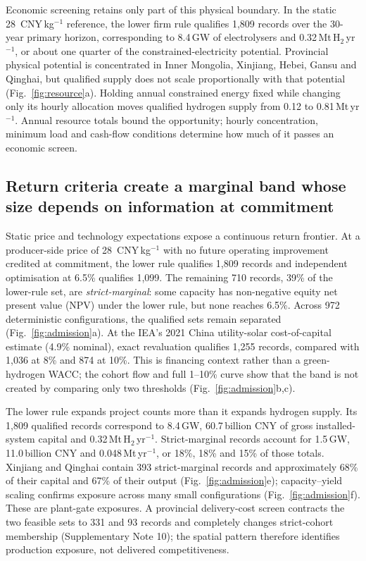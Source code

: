 \documentclass[11pt,a4paper]{article}
\newcommand{\cnykg}{CNY\,kg$^{-1}$}
\begin{document}
Economic screening retains only part of this physical boundary. In the static 28~\cnykg{} reference, the lower firm rule qualifies 1,809 records over the 30-year primary horizon, corresponding to 8.4\,GW of electrolysers and 0.32\,Mt\,H$_2$\,yr$^{-1}$, or about one quarter of the constrained-electricity potential. Provincial physical potential is concentrated in Inner Mongolia, Xinjiang, Hebei, Gansu and Qinghai, but qualified supply does not scale proportionally with that potential (Fig.~\ref{fig:resource}a). Holding annual constrained energy fixed while changing only its hourly allocation moves qualified hydrogen supply from 0.12 to 0.81\,Mt\,yr$^{-1}$. Annual resource totals bound the opportunity; hourly concentration, minimum load and cash-flow conditions determine how much of it passes an economic screen.

\subsection*{Return criteria create a marginal band whose size depends on information at commitment}

Static price and technology expectations expose a continuous return frontier. At a producer-side price of 28~\cnykg{} with no future operating improvement credited at commitment, the lower rule qualifies 1,809 records and independent optimisation at 6.5\% qualifies 1,099. The remaining 710 records, 39\% of the lower-rule set, are \emph{strict-marginal}: some capacity has non-negative equity net present value (NPV) under the lower rule, but none reaches 6.5\%. Across 972 deterministic configurations, the qualified sets remain separated (Fig.~\ref{fig:admission}a). At the IEA's 2021 China utility-solar cost-of-capital estimate (4.9\% nominal), exact revaluation qualifies 1,255 records, compared with 1,036 at 8\% and 874 at 10\%\cite{ieacapital}. This is financing context rather than a green-hydrogen WACC; the cohort flow and full 1--10\% curve show that the band is not created by comparing only two thresholds (Fig.~\ref{fig:admission}b,c).

The lower rule expands project counts more than it expands hydrogen supply. Its 1,809 qualified records correspond to 8.4\,GW, 60.7\,billion CNY of gross installed-system capital and 0.32\,Mt\,H$_2$\,yr$^{-1}$. Strict-marginal records account for 1.5\,GW, 11.0\,billion CNY and 0.048\,Mt\,yr$^{-1}$, or 18\%, 18\% and 15\% of those totals. Xinjiang and Qinghai contain 393 strict-marginal records and approximately 68\% of their capital and 67\% of their output (Fig.~\ref{fig:admission}e); capacity--yield scaling confirms exposure across many small configurations (Fig.~\ref{fig:admission}f). These are plant-gate exposures. A provincial delivery-cost screen\cite{bi2026} contracts the two feasible sets to 331 and 93 records and completely changes strict-cohort membership (Supplementary Note 10); the spatial pattern therefore identifies production exposure, not delivered competitiveness.
\end{document}
